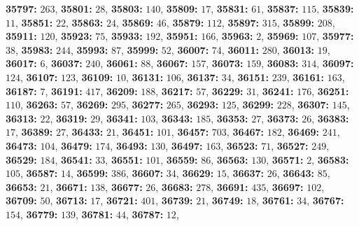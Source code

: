 \textsf{\bfseries 35797:} $263$, \textsf{\bfseries 35801:} $28$, \textsf{\bfseries 35803:} $140$, \textsf{\bfseries 35809:} $17$, \textsf{\bfseries 35831:} $61$, \textsf{\bfseries 35837:} $115$, \textsf{\bfseries 35839:} $11$, \textsf{\bfseries 35851:} $22$, \textsf{\bfseries 35863:} $24$, \textsf{\bfseries 35869:} $46$, \textsf{\bfseries 35879:} $112$, \textsf{\bfseries 35897:} $315$, \textsf{\bfseries 35899:} $208$, \textsf{\bfseries 35911:} $120$, \textsf{\bfseries 35923:} $75$, \textsf{\bfseries 35933:} $192$, \textsf{\bfseries 35951:} $166$, \textsf{\bfseries 35963:} $2$, \textsf{\bfseries 35969:} $107$, \textsf{\bfseries 35977:} $38$, \textsf{\bfseries 35983:} $244$, \textsf{\bfseries 35993:} $87$, \textsf{\bfseries 35999:} $52$, \textsf{\bfseries 36007:} $74$, \textsf{\bfseries 36011:} $280$, \textsf{\bfseries 36013:} $19$, \textsf{\bfseries 36017:} $6$, \textsf{\bfseries 36037:} $240$, \textsf{\bfseries 36061:} $88$, \textsf{\bfseries 36067:} $157$, \textsf{\bfseries 36073:} $159$, \textsf{\bfseries 36083:} $314$, \textsf{\bfseries 36097:} $124$, \textsf{\bfseries 36107:} $123$, \textsf{\bfseries 36109:} $10$, \textsf{\bfseries 36131:} $106$, \textsf{\bfseries 36137:} $34$, \textsf{\bfseries 36151:} $239$, \textsf{\bfseries 36161:} $163$, \textsf{\bfseries 36187:} $7$, \textsf{\bfseries 36191:} $417$, \textsf{\bfseries 36209:} $188$, \textsf{\bfseries 36217:} $57$, \textsf{\bfseries 36229:} $31$, \textsf{\bfseries 36241:} $176$, \textsf{\bfseries 36251:} $110$, \textsf{\bfseries 36263:} $57$, \textsf{\bfseries 36269:} $295$, \textsf{\bfseries 36277:} $265$, \textsf{\bfseries 36293:} $125$, \textsf{\bfseries 36299:} $228$, \textsf{\bfseries 36307:} $145$, \textsf{\bfseries 36313:} $22$, \textsf{\bfseries 36319:} $29$, \textsf{\bfseries 36341:} $103$, \textsf{\bfseries 36343:} $185$, \textsf{\bfseries 36353:} $27$, \textsf{\bfseries 36373:} $26$, \textsf{\bfseries 36383:} $17$, \textsf{\bfseries 36389:} $27$, \textsf{\bfseries 36433:} $21$, \textsf{\bfseries 36451:} $101$, \textsf{\bfseries 36457:} $703$, \textsf{\bfseries 36467:} $182$, \textsf{\bfseries 36469:} $241$, \textsf{\bfseries 36473:} $104$, \textsf{\bfseries 36479:} $174$, \textsf{\bfseries 36493:} $130$, \textsf{\bfseries 36497:} $163$, \textsf{\bfseries 36523:} $71$, \textsf{\bfseries 36527:} $249$, \textsf{\bfseries 36529:} $184$, \textsf{\bfseries 36541:} $33$, \textsf{\bfseries 36551:} $101$, \textsf{\bfseries 36559:} $86$, \textsf{\bfseries 36563:} $130$, \textsf{\bfseries 36571:} $2$, \textsf{\bfseries 36583:} $105$, \textsf{\bfseries 36587:} $14$, \textsf{\bfseries 36599:} $386$, \textsf{\bfseries 36607:} $34$, \textsf{\bfseries 36629:} $15$, \textsf{\bfseries 36637:} $26$, \textsf{\bfseries 36643:} $85$, \textsf{\bfseries 36653:} $21$, \textsf{\bfseries 36671:} $138$, \textsf{\bfseries 36677:} $26$, \textsf{\bfseries 36683:} $278$, \textsf{\bfseries 36691:} $435$, \textsf{\bfseries 36697:} $102$, \textsf{\bfseries 36709:} $50$, \textsf{\bfseries 36713:} $17$, \textsf{\bfseries 36721:} $401$, \textsf{\bfseries 36739:} $21$, \textsf{\bfseries 36749:} $18$, \textsf{\bfseries 36761:} $34$, \textsf{\bfseries 36767:} $154$, \textsf{\bfseries 36779:} $139$, \textsf{\bfseries 36781:} $44$, \textsf{\bfseries 36787:} $12$, 
